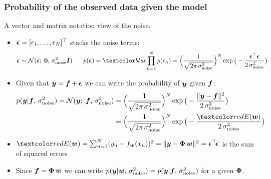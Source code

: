 \begin{frame}
\frametitle{Probability of the observed data given the model}

A vector and matrix notation view of the noise.
\begin{itemize}
\item $\boldsymbol{\epsilon}=[\epsilon_1,\ldots,\epsilon_N]^\top$ stacks the  noise terms:
%
\[
\bepsilon\sim\N(\bepsilon;\;\mathbf{0},\,\sigma_\mathrm{noise}^2\bfI)
\hspace{4ex}
p(\bepsilon)=\Blue{\prod_{n=1}^N p(\epsilon_n)}=
\Big(\frac{1}{\sqrt{2\pi\,\sigma_\mathrm{noise}^2}}\Big)^N
\exp{\big(-\frac{\bepsilon^\top\bepsilon}{2\,\sigma_\mathrm{noise}^2}\big)}
\]
% 
\item Given that $\bm y=\bm f+\boldsymbol{\epsilon}$ we can write the probability of $\bm y$ given $\bm f$:
%
\begin{align*}
p(\bfy|\bff,\,\sigma_\mathrm{noise}^2)=\N(\bfy;\;\bff,\,\sigma_\mathrm{noise}^2)
&=\Big(\frac{1}{\sqrt{2\pi\,\sigma_\mathrm{noise}^2}}\Big)^N
\exp{\big(-\frac{\|\bfy-\bff\|^2}{2\,\sigma_\mathrm{noise}^2}\big)}\\
&=\Big(\frac{1}{\sqrt{2\pi\,\sigma_\mathrm{noise}^2}}\Big)^N
\exp{\big(-\frac{\Red{E(\bfw)}}{2\,\sigma_\mathrm{noise}^2}\big)}
\end{align*}
%
\item
  $\Red{E(\bfw)}=\sum_{n=1}^N(y_n-f_{\bm w}(x_n))^2=\|\bfy-\bPhi\,\bfw\|^2
  = \bepsilon^\top\!\bepsilon$ is the sum of squared errors
\item Since $\bm f=\boldsymbol{\Phi}\,\bm w$ we can write 
$p(\bm y|\bm w,\,\sigma_\mathrm{noise}^2)=p(\bm y|\bm f,\,\sigma_\mathrm{noise}^2)$ for a given $\boldsymbol{\Phi}$.
\end{itemize}
\end{frame}


